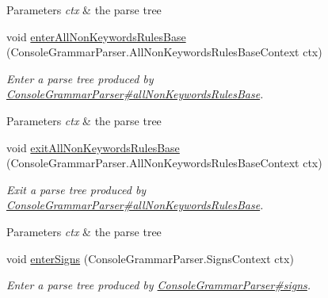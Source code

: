 \begin{DoxyCompactItemize}
\begin{DoxyCompactList}
\begin{DoxyParams}{Parameters}
{\em ctx} & the parse tree\\
\hline
\end{DoxyParams}
 \end{DoxyCompactList}\item 
void \hyperlink{classgov_1_1nasa_1_1jpf_1_1inspector_1_1client_1_1parser_1_1_console_grammar_base_listener_a2c280a2a84fbfae68171abca21d0368e}{enter\+All\+Non\+Keywords\+Rules\+Base} (Console\+Grammar\+Parser.\+All\+Non\+Keywords\+Rules\+Base\+Context ctx)
\begin{DoxyCompactList}\small\item\em Enter a parse tree produced by \hyperlink{classgov_1_1nasa_1_1jpf_1_1inspector_1_1client_1_1parser_1_1_console_grammar_parser_a926661be2c5cd242388c918b3de759c3}{Console\+Grammar\+Parser\#all\+Non\+Keywords\+Rules\+Base}.


\begin{DoxyParams}{Parameters}
{\em ctx} & the parse tree\\
\hline
\end{DoxyParams}
 \end{DoxyCompactList}\item 
void \hyperlink{classgov_1_1nasa_1_1jpf_1_1inspector_1_1client_1_1parser_1_1_console_grammar_base_listener_a7ea3a6ed1a934ddc899ee34b403d1fbb}{exit\+All\+Non\+Keywords\+Rules\+Base} (Console\+Grammar\+Parser.\+All\+Non\+Keywords\+Rules\+Base\+Context ctx)
\begin{DoxyCompactList}\small\item\em Exit a parse tree produced by \hyperlink{classgov_1_1nasa_1_1jpf_1_1inspector_1_1client_1_1parser_1_1_console_grammar_parser_a926661be2c5cd242388c918b3de759c3}{Console\+Grammar\+Parser\#all\+Non\+Keywords\+Rules\+Base}.


\begin{DoxyParams}{Parameters}
{\em ctx} & the parse tree\\
\hline
\end{DoxyParams}
 \end{DoxyCompactList}\item 
void \hyperlink{classgov_1_1nasa_1_1jpf_1_1inspector_1_1client_1_1parser_1_1_console_grammar_base_listener_aaaffa50f305e59056c559b4e37cbff18}{enter\+Signs} (Console\+Grammar\+Parser.\+Signs\+Context ctx)
\begin{DoxyCompactList}\small\item\em Enter a parse tree produced by \hyperlink{classgov_1_1nasa_1_1jpf_1_1inspector_1_1client_1_1parser_1_1_console_grammar_parser_ab04c24317356d7b5f9d1ba1b0a8ed331}{Console\+Grammar\+Parser\#signs}.



\end{DoxyCompactList}
\end{DoxyCompactItemize}
